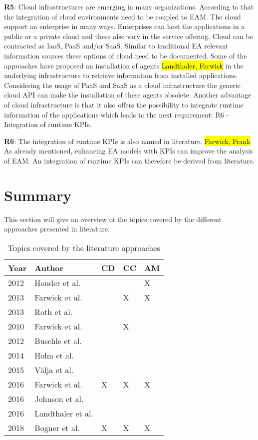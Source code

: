 \textbf{R5}: Cloud infrastructures are emerging in many organizations. According to that the integration of cloud environments need to be coupled to EAM. The cloud support an enterprise in many ways. Enterprises can host the applications in a public or a private cloud and these also vary in the service offering. Cloud can be contracted as IaaS, PaaS and/or SaaS. Similar to traditional EA relevant information sources these options of cloud need to be documented. Some of the approaches have proposed an installation of agents \hl{Landthaler, Farwick} in the underlying infrastructure to retrieve information from installed applications. Considering the usage of PaaS and SaaS as a cloud infrastructure the generic cloud API can make the installation of these agents obsolete. Another advantage of cloud infrastructure is that it also offers the possibility to integrate runtime information of the applications which leads to the next requirement: R6 - Integration of runtime KPIs.

\textbf{R6}: The integration of runtime KPIs is also named in literature. \hl{Farwick, Frank} As already mentioned, enhancing EA models with KPIs can improve the analysis of EAM. An integration of runtime KPIs can therefore be derived from literature.


\section{Summary}

This section will give an overview of the topics covered by the different approaches presented in literature. 

\begin{table}[htpb]
  \caption[Topics covered by the literature approaches]{Topics covered by the literature approaches}\label{tab:sample}
  \centering
  \begin{tabular}{l l l l l}
    \toprule
      Year & Author & CD & CC & AM\\
    \midrule
      2012 & Hauder et al. &   &   & X\\
      2013 & Farwick et al. &   & X & X\\
      2013 & Roth et al. &   &   &  \\
      2010 & Farwick et al. &   & X &  \\
      2012 & Buschle et al. &   &   &  \\
      2014 & Holm et al. &   &   &  \\
      2015 & Välja et al. &   &   &  \\
      2016 & Farwick et al. & X & X & X\\
      2016 & Johnson et al. &   &   &  \\
      2016 & Landthaler et al. &   &   &  \\
      2018 & Bogner et al. & X & X & X\\
    \bottomrule
  \end{tabular}
\end{table}

